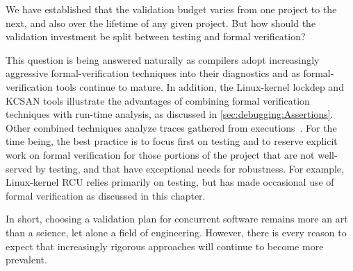 We have established that the validation budget varies from one project
to the next, and also over the lifetime of any given project.
But how should the validation investment be split between testing and
formal verification?

This question is being answered naturally as compilers adopt increasingly
aggressive formal-verification techniques into their diagnostics and
as formal-verification tools continue to mature.
In addition, the Linux-kernel lockdep and KCSAN tools illustrate the
advantages of combining formal verification techniques with run-time
analysis, as discussed in \cref{sec:debugging:Assertions}.
Other combined techniques analyze traces gathered from
executions~\cite{DanielBristot2019RTtrace}.
For the time being, the best practice is to focus first on testing and to
reserve explicit work on formal verification for those portions of the
project that are not well-served by testing, and that have exceptional
needs for robustness.
For example, Linux-kernel RCU relies primarily on testing, but has
made occasional use of formal verification as discussed in this chapter.

In short, choosing a validation plan for concurrent software remains
more an art than a science, let alone a field of engineering.
However, there is every reason to expect that increasingly rigorous
approaches will continue to become more prevalent.

